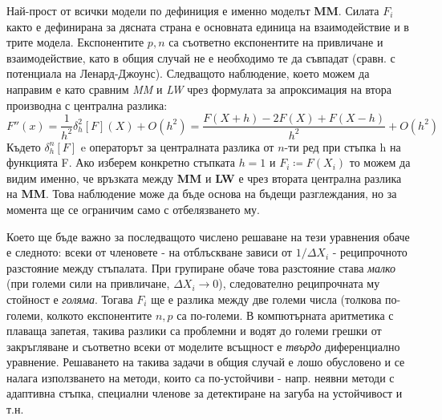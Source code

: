 \begin{table}[hbpt]
\caption{Конкретни изрази за безразмерните сили на привличане и отблъскване}
\label{tabl:rhs_bunching_ode}
\end{table}
Най-прост от всички модели по дефиниция е именно моделът \textbf{MM}. Силата $F_i$ както е дефинирана за дясната страна е основната единица на взаимодействие и в трите модела. Експонентите $p, n$ са съответно експонентите на привличане и взаимодействие, като в общия случай не е необходимо те да съвпадат (сравн. с потенциала на Ленард-Джоунс).
Следващото наблюдение, което можем да направим е като сравним \textit{MM} и \textit{LW} чрез формулата за апроксимация на втора производна с централна разлика:
\begin{equation*}
    F''(x) = \frac{1}{h^2} \delta_h^2 [F](X) + O(h^2) = \frac{F(X+h) - 2F(X) + F(X-h)}{h^2} + O(h^2)
\end{equation*}
Където $\delta_h^n[F]$ e операторът за централната разлика от $n$-ти ред при стъпка h на функцията F.
Ако изберем конкретно стъпката $h = 1$ и $F_i \coloneqq F(X_i)$ то можем да видим именно, че връзката между \textbf{MM} и \textbf{LW} е чрез втората централна разлика на \textbf{MM}. Това наблюдение може да бъде основа на бъдещи разглеждания, но за момента ще се ограничим само с отбелязването му.

Което ще бъде важно за последващото числено решаване на тези уравнения обаче е следното: всеки от членовете - на отблъскване зависи от $1/{\Delta X_{i}}$ - реципрочното разстояние между стъпалата. При групиране обаче това разстояние става \textit{малко} (при големи сили на привличане, $\Delta X_i \rightarrow 0$), следователно реципрочната му стойност е \textit{голяма}. Тогава $F_i$ ще е разлика между две големи числа (толкова по-големи, колкото експонентите $n, p$ са по-големи. В компютърната аритметика с плаваща запетая, такива разлики са проблемни и водят до големи грешки от закръгляване и съответно всеки от моделите всъщност е \textit{твърдо} диференциално уравнение. Решаването на такива задачи в общия случай е лошо обусловено и се налага използването на методи, които са по-устойчиви - напр. неявни методи с адаптивна стъпка, специални членове за детектиране на загуба на устойчивост и т.н.

